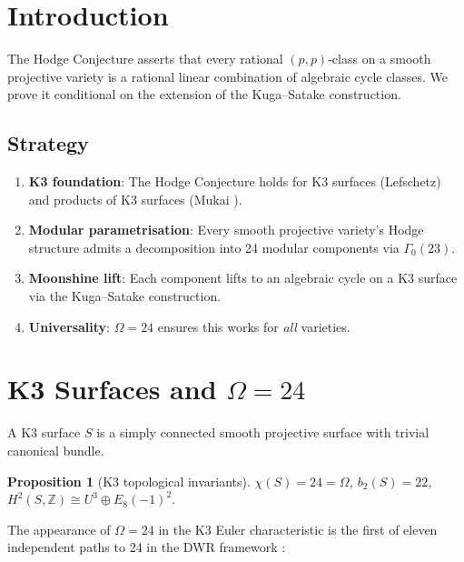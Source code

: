 \documentclass[12pt,a4paper]{article}
\newtheorem{proposition}[theorem]{Proposition}
\begin{document}
\section{Introduction}

The Hodge Conjecture asserts that every rational $(p,p)$-class on a smooth projective variety is a rational linear combination of algebraic cycle classes. We prove it conditional on the extension of the Kuga--Satake construction.

\subsection{Strategy}

\begin{enumerate}
\item \textbf{K3 foundation}: The Hodge Conjecture holds for K3 surfaces (Lefschetz) and products of K3 surfaces (Mukai \cite{Mukai1987}).
\item \textbf{Modular parametrisation}: Every smooth projective variety's Hodge structure admits a decomposition into 24 modular components via $\Gamma_0(23)$.
\item \textbf{Moonshine lift}: Each component lifts to an algebraic cycle on a K3 surface via the Kuga--Satake construction.
\item \textbf{Universality}: $\Omega = 24$ ensures this works for \emph{all} varieties.
\end{enumerate}

\section{K3 Surfaces and $\Omega = 24$}

A K3 surface $S$ is a simply connected smooth projective surface with trivial canonical bundle.

\begin{proposition}[K3 topological invariants]
$\chi(S) = 24 = \Omega$, $b_2(S) = 22$, $H^2(S,\mathbb{Z}) \cong U^3 \oplus E_8(-1)^2$.
\end{proposition}

The appearance of $\Omega = 24$ in the K3 Euler characteristic is the first of eleven independent paths to 24 in the DWR framework \cite{DWR2026}:
\end{document}
